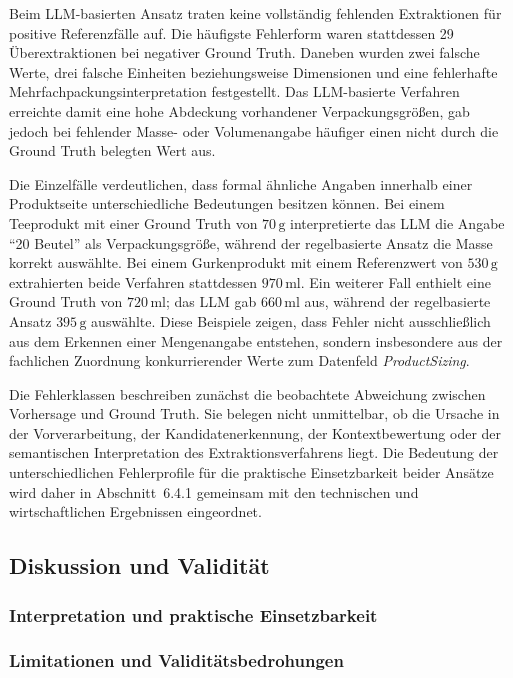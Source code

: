 Beim LLM-basierten Ansatz traten keine vollständig fehlenden Extraktionen für positive Referenzfälle auf. Die häufigste Fehlerform waren stattdessen 29 Überextraktionen bei negativer Ground Truth. Daneben wurden zwei falsche Werte, drei falsche Einheiten beziehungsweise Dimensionen und eine fehlerhafte Mehrfachpackungsinterpretation festgestellt. Das LLM-basierte Verfahren erreichte damit eine hohe Abdeckung vorhandener Verpackungsgrößen, gab jedoch bei fehlender Masse- oder Volumenangabe häufiger einen nicht durch die Ground Truth belegten Wert aus.

Die Einzelfälle verdeutlichen, dass formal ähnliche Angaben innerhalb einer Produktseite unterschiedliche Bedeutungen besitzen können. Bei einem Teeprodukt mit einer Ground Truth von \(70\,\mathrm{g}\) interpretierte das LLM die Angabe \enquote{20 Beutel} als Verpackungsgröße, während der regelbasierte Ansatz die Masse korrekt auswählte. Bei einem Gurkenprodukt mit einem Referenzwert von \(530\,\mathrm{g}\) extrahierten beide Verfahren stattdessen \(970\,\mathrm{ml}\). Ein weiterer Fall enthielt eine Ground Truth von \(720\,\mathrm{ml}\); das LLM gab \(660\,\mathrm{ml}\) aus, während der regelbasierte Ansatz \(395\,\mathrm{g}\) auswählte. Diese Beispiele zeigen, dass Fehler nicht ausschließlich aus dem Erkennen einer Mengenangabe entstehen, sondern insbesondere aus der fachlichen Zuordnung konkurrierender Werte zum Datenfeld \textit{ProductSizing}.

Die Fehlerklassen beschreiben zunächst die beobachtete Abweichung zwischen Vorhersage und Ground Truth. Sie belegen nicht unmittelbar, ob die Ursache in der Vorverarbeitung, der Kandidatenerkennung, der Kontextbewertung oder der semantischen Interpretation des Extraktionsverfahrens liegt. Die Bedeutung der unterschiedlichen Fehlerprofile für die praktische Einsetzbarkeit beider Ansätze wird daher in Abschnitt~6.4.1 gemeinsam mit den technischen und wirtschaftlichen Ergebnissen eingeordnet.

\subsection{Diskussion und Validität}

\subsubsection{Interpretation und praktische Einsetzbarkeit}

\subsubsection{Limitationen und Validitätsbedrohungen}